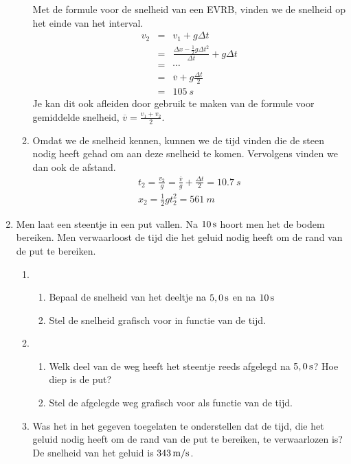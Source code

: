 \begin{enumerate}
\begin{oplossing}
\begin{enumerate}
\begin{minipage}[t][4.5cm][b]{.3\textwidth}
\end{minipage}
\newline
\newline
\newline
Met de formule voor de snelheid van een EVRB, vinden we de snelheid op het einde van het interval.
\begin{eqnarray*}
v_2&=&v_1+g\Delta t\\
&=&\frac{\Delta x-\frac{1}{2}g\Delta t^2}{\Delta t}+g\Delta t\\
&=&\cdots\\
&=&\overline{v}+g\frac{\Delta t}{2}\\
&=&\SI{105}{s}
\end{eqnarray*}
Je kan dit ook afleiden door gebruik te maken van de formule voor gemiddelde snelheid, $\overline{v}=\frac{v_1+v_2}{2}$.
\item Omdat we de snelheid kennen, kunnen we de tijd vinden die de steen nodig heeft gehad om aan deze snelheid te komen. Vervolgens vinden we dan ook de afstand.
\begin{eqnarray*}
t_2=\frac{v_2}{g}=\frac{\overline{v}}{g}+\frac{\Delta t}{2}=\SI{10,7}{s}\\
x_2=\frac{1}{2}gt_2^2=\SI{561}{m}
\end{eqnarray*}
\end{enumerate}
\end{oplossing}



\item Men laat een steentje in een put vallen. Na $10\rm\,s$ hoort
men het de bodem bereiken. Men verwaarloost de tijd die het geluid
nodig heeft om de rand van de put te bereiken.
\begin{enumerate}
\item
\begin{enumerate}
\item Bepaal de snelheid van het deeltje na $5,0\rm\,s$ en na $10\rm\,s$
\item Stel de snelheid grafisch voor in functie van de tijd.
\end{enumerate}
\item
\begin{enumerate}
\item Welk deel van de weg heeft het steentje reeds afgelegd na
$5,0\rm\,s$? Hoe diep is de put?
\item Stel de afgelegde weg grafisch voor als functie van de tijd.
\end{enumerate}
\item Was het in het gegeven toegelaten te onderstellen dat de tijd,
die het geluid nodig heeft om de rand van de put te bereiken, te
verwaarlozen is? De snelheid van het geluid is $343\rm\,m/s$.
\end{enumerate}


\end{enumerate}
